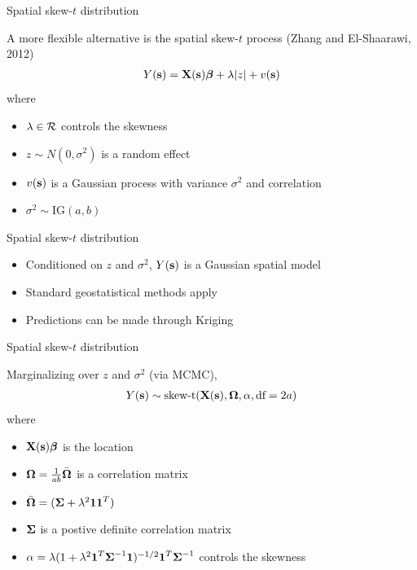 \documentclass{beamer}
\begin{document}
\begin{frame}{Spatial skew-$t$ distribution}
\begin{adjustwidth}{1em}{0em}
  A more flexible alternative is the spatial skew-$t$ process (Zhang and El-Shaarawi, 2012)
  \begin{align*}
    Y(\mbox{\bf s}) = \mbox{\bf X}(\mbox{\bf s})\mbox{\boldmath $\beta$} + \lambda |z| + v(\mbox{\bf s})
  \end{align*}
  where
  \begin{itemize} \setlength{\itemsep}{0.25em}
    \item $\lambda \in {\cal R}$ controls the skewness
    \item $z \sim N(0, \sigma^2)$ is a random effect
    \item $v(\mbox{\bf s})$ is a Gaussian process with variance $\sigma^2$ and \Matern correlation
    \item $\sigma^2 \sim \text{IG}(a, b)$
  \end{itemize}
\end{adjustwidth}
\end{frame}

\begin{frame}{Spatial skew-$t$ distribution}
  \begin{itemize} \setlength{\itemsep}{1em}
    \item \alert{Conditioned} on $z$ and $\sigma^2$, $Y(\mbox{\bf s})$ is a Gaussian spatial model
    \item Standard geostatistical methods apply
    \item Predictions can be made through Kriging
  \end{itemize}
\end{frame}

\begin{frame}{Spatial skew-$t$ distribution}
\begin{adjustwidth}{1em}{0em}
  \alert{Marginalizing} over $z$ and $\sigma^2$ (via MCMC),
  \begin{align*}
    Y(\mbox{\bf s}) \sim \text{skew-t}(\mbox{\bf X}(\mbox{\bf s}), \mbox{\boldmath $\Omega$}, \alpha, \text{df}=2a)
  \end{align*}
  where
  \begin{itemize} \setlength{\itemsep}{0.25em}
    \item $\mbox{\bf X}(\mbox{\bf s}) \mbox{\boldmath $\beta$}$ is the location
    \item $\mbox{\boldmath $\Omega$} = \frac{1}{ab} \bar{\mbox{\boldmath $\Omega$}}$ is a correlation matrix
    \item $\bar{\mbox{\boldmath $\Omega$}} = (\mbox{\boldmath $\Sigma$} + \lambda^2 \mbox{\boldmath $1$} \mbox{\boldmath $1$}^T)$
    \item $\mbox{\boldmath $\Sigma$}$ is a postive definite correlation matrix
    \item $\alpha = \lambda( 1 + \lambda^2 \mbox{\boldmath $1$}^T \mbox{\boldmath $\Sigma$}^{-1} \mbox{\boldmath $1$})^{-1/2} \mbox{\boldmath $1$}^T \mbox{\boldmath $\Sigma$}^{-1}$ controls the skewness
  \end{itemize}
\end{adjustwidth}
\end{frame}
\end{document}
